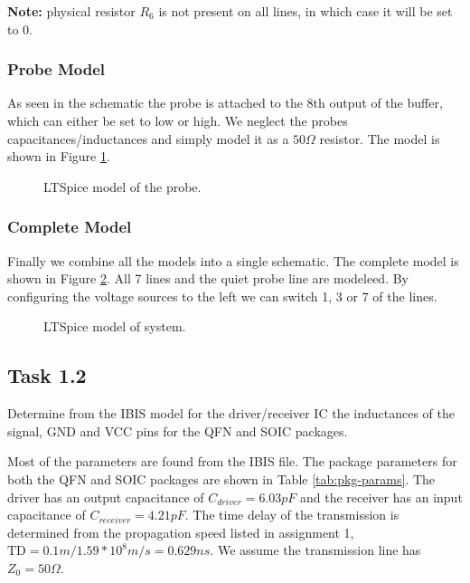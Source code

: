 \documentclass[../main.tex]{subfiles}
\begin{document}
\textbf{Note:} physical resistor $R_6$ is not present on all lines, in which case it will be set to 0.

\subsubsection{Probe Model}

As seen in the schematic the probe is attached to the 8th output of the buffer, which can either be set to low or high. We neglect the probes capacitances/inductances and simply model it as a $50\si{\Omega}$ resistor. The model is shown in Figure \ref{fig:probe}.

\begin{figure}[h]
    \centering
    \caption{LTSpice model of the probe.}
    \label{fig:probe}
\end{figure}

\subsubsection{Complete Model}

Finally we combine all the models into a single schematic. The complete model is shown in Figure \ref{fig:complete}. All 7 lines and the quiet probe line are modeleed. By configuring the voltage sources to the left we can switch 1, 3 or 7 of the lines. 

\newpage

\begin{figure}[h]
    \centering
    \caption{LTSpice model of system.}
    \label{fig:complete}
\end{figure}

\newpage

\subsection{Task 1.2}

Determine from the IBIS model for the driver/receiver IC the inductances of the signal, GND and VCC pins for the QFN and SOIC packages.

\solution

Most of the parameters are found from the IBIS file. The package parameters for both the QFN and SOIC packages are shown in Table \ref{tab:pkg-params}. The driver has an output capacitance of $C_{driver} = 6.03\si{pF}$ and the receiver has an input capacitance of $C_{receiver} = 4.21\si{pF}$. The time delay of the transmission is determined from the propagation speed listed in assignment 1, $\text{TD} = 0.1 \si{m} / 1.59 * 10^8\si{m/s} = 0.629 \si{ns}$. We assume the transmission line has $Z_0 = 50\si{\Omega}$.
\end{document}
